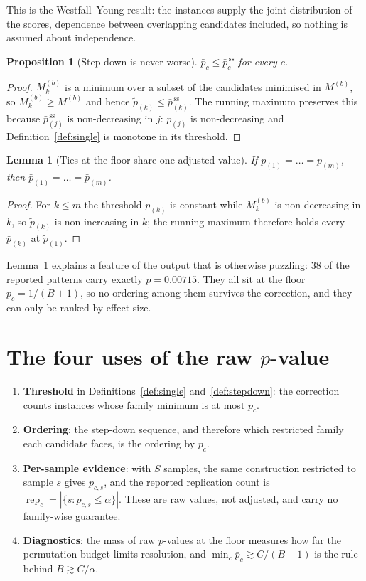 \documentclass[11pt,a4paper]{article}
\newtheorem{proposition}[definition]{Proposition}
\newtheorem{lemma}[definition]{Lemma}
\theoremstyle{remark}
\newcommand{\adj}{\bar p}
\newcommand{\rep}{\operatorname{rep}}
\begin{document}
This is the Westfall--Young result: the instances supply the joint distribution
of the scores, dependence between overlapping candidates included, so nothing
is assumed about independence.

\begin{proposition}[Step-down is never worse]
$\adj_c\le\adj^{\,\mathrm{ss}}_c$ for every $c$.
\end{proposition}

\begin{proof}
$M^{(b)}_k$ is a minimum over a subset of the candidates minimised in
$M^{(b)}$, so $M^{(b)}_k\ge M^{(b)}$ and hence $\tilde p_{(k)}\le
\adj^{\,\mathrm{ss}}_{(k)}$. The running maximum preserves this because
$\adj^{\,\mathrm{ss}}_{(j)}$ is non-decreasing in $j$: $p_{(j)}$ is
non-decreasing and Definition~\ref{def:single} is monotone in its threshold.
\end{proof}

\begin{lemma}[Ties at the floor share one adjusted value]
\label{lem:ties}
If $p_{(1)}=\dots=p_{(m)}$, then $\adj_{(1)}=\dots=\adj_{(m)}$.
\end{lemma}

\begin{proof}
For $k\le m$ the threshold $p_{(k)}$ is constant while $M_k^{(b)}$ is
non-decreasing in $k$, so $\tilde p_{(k)}$ is non-increasing in $k$; the
running maximum therefore holds every $\adj_{(k)}$ at $\tilde p_{(1)}$.
\end{proof}

Lemma~\ref{lem:ties} explains a feature of the output that is otherwise
puzzling: $38$ of the reported patterns carry exactly $\adj=0.00715$. They all
sit at the floor $p_c=1/(B+1)$, so no ordering among them survives the
correction, and they can only be ranked by effect size.

\section{The four uses of the raw \texorpdfstring{$p$}{p}-value}

\begin{enumerate}[itemsep=3pt]
  \item \textbf{Threshold} in Definitions~\ref{def:single}
    and~\ref{def:stepdown}: the correction counts instances whose family
    minimum is at most $p_c$.
  \item \textbf{Ordering}: the step-down sequence, and therefore which
    restricted family each candidate faces, is the ordering by $p_c$.
  \item \textbf{Per-sample evidence}: with $S$ samples, the same construction
    restricted to sample $s$ gives $p_{c,s}$, and the reported replication
    count is $\rep_c=|\{s:p_{c,s}\le\alpha\}|$. These are raw values, not
    adjusted, and carry no family-wise guarantee.
  \item \textbf{Diagnostics}: the mass of raw $p$-values at the floor measures
    how far the permutation budget limits resolution, and
    $\min_c\adj_c\gtrsim C/(B+1)$ is the rule behind $B\gtrsim C/\alpha$.
\end{enumerate}
\end{document}
